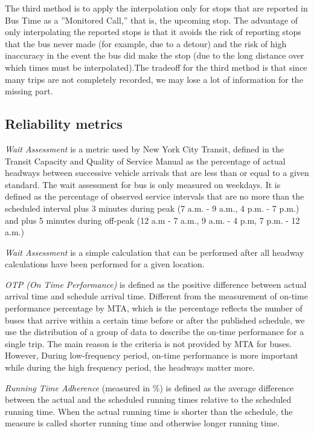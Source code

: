 \documentclass[12pt]{report}
\begin{document}
The third method is to apply the interpolation only for stops that are reported in Bus Time as a ''Monitored Call,'' that is, the upcoming stop. The advantage of only interpolating the reported stops is that it avoids the risk of reporting stops that the bus never made (for example, due to a detour) and the risk of high inaccuracy in the event the bus did make the stop (due to the long distance over which times must be interpolated).The tradeoff for the third method is that since many trips are not completely recorded, we may lose a lot of information for the missing part.

\subsection{Reliability metrics}

\textit{Wait Assessment} is a metric used by New York City Transit, defined in the Transit Capacity and Quality of Service Manual as the percentage of actual headways between successive vehicle arrivals that are less than or equal to a given standard. The wait assessment for bus is only measured on weekdays. It is defined as the percentage of observed service intervals that are no more than the scheduled interval plus 3 minutes during peak (7 a.m. - 9 a.m., 4 p.m. - 7 p.m.) and plus 5 minutes during off-peak (12 a.m - 7 a.m., 9 a.m. - 4 p.m, 7 p.m. - 12 a.m.)

\textit{Wait Assessment} is a simple calculation that can be performed after all headway calculations have been performed for a given location.

\textit{OTP (On Time Performance)} is defined as the positive difference between actual arrival time and schedule arrival time. Different from the measurement of on-time performance percentage by MTA, which is the percentage reflects the number of buses that arrive within a certain time before or after the published schedule, we use the distribution of a group of data to describe the on-time performance for a single trip. The main reason is the criteria is not provided by MTA for buses. However, During low-frequency period, on-time performance is more important while during the high frequency period, the headways matter more. 

\textit{Running Time Adherence} (measured in \%) is defined as the average difference between the actual and the scheduled running times relative to the scheduled running time. When the actual running time is shorter than the schedule, the measure is called shorter running time and otherwise longer running time.
\end{document}
